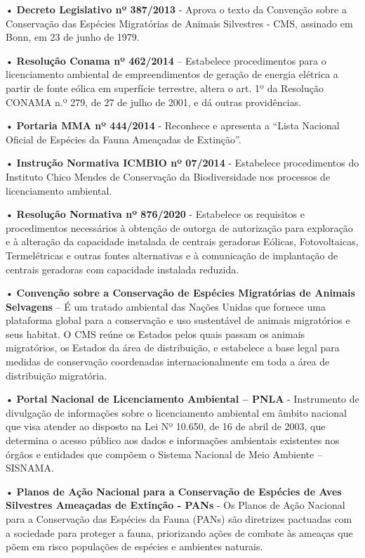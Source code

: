 \documentclass[
  oneside]{scrbook}
\begin{document}
• \textbf{Decreto Legislativo nº 387/2013} - Aprova o texto da Convenção sobre a Conservação das Espécies Migratórias de Animais Silvestres - CMS, assinado em Bonn, em 23 de junho de 1979.

• \textbf{Resolução Conama nº 462/2014} -- Estabelece procedimentos para o licenciamento ambiental de empreendimentos de geração de energia elétrica a partir de fonte eólica em superfície terrestre, altera o art. 1º da Resolução CONAMA n.º 279, de 27 de julho de 2001, e dá outras providências.

• \textbf{Portaria MMA nº 444/2014} - Reconhece e apresenta a ``Lista Nacional Oficial de Espécies da Fauna Ameaçadas de Extinção''.

• \textbf{Instrução Normativa ICMBIO nº 07/2014} - Estabelece procedimentos do Instituto Chico Mendes de Conservação da Biodiversidade nos processos de licenciamento ambiental.

• \textbf{Resolução Normativa nº 876/2020} - Estabelece os requisitos e procedimentos necessários à obtenção de outorga de autorização para exploração e à alteração da capacidade instalada de centrais geradoras Eólicas, Fotovoltaicas, Termelétricas e outras fontes alternativas e à comunicação de implantação de centrais geradoras com capacidade instalada reduzida.

• \textbf{Convenção sobre a Conservação de Espécies Migratórias de Animais Selvagens} -- É um tratado ambiental das Nações Unidas que fornece uma plataforma global para a conservação e uso sustentável de animais migratórios e seus habitat. O CMS reúne os Estados pelos quais passam os animais migratórios, os Estados da área de distribuição, e estabelece a base legal para medidas de conservação coordenadas internacionalmente em toda a área de distribuição migratória.

• \textbf{Portal Nacional de Licenciamento Ambiental -- PNLA} - Instrumento de divulgação de informações sobre o licenciamento ambiental em âmbito nacional que visa atender ao disposto na Lei Nº 10.650, de 16 de abril de 2003, que determina o acesso público aos dados e informações ambientais existentes nos órgãos e entidades que compõem o Sistema Nacional de Meio Ambiente -- SISNAMA.

• \textbf{Planos de Ação Nacional para a Conservação de Espécies de Aves Silvestres Ameaçadas de Extinção - PANs} - Os Planos de Ação Nacional para a Conservação das Espécies da Fauna (PANs) são diretrizes pactuadas com a sociedade para proteger a fauna, priorizando ações de combate às ameaças que põem em risco populações de espécies e ambientes naturais.

  
\end{document}
